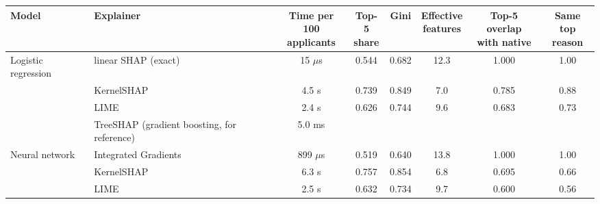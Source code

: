 \begin{tabular}{llcccccc}
\toprule
Model & Explainer & \makecell{Time per 100\\applicants} & \makecell{Top-5\\share} & Gini & \makecell{Effective\\features} & \makecell{Top-5 overlap\\with native} & \makecell{Same top\\reason} \\
\midrule
Logistic regression & linear SHAP (exact) & 15 $\mu$s & 0.544 & 0.682 & 12.3 & 1.000 & 1.00 \\
 & KernelSHAP & 4.5 s & 0.739 & 0.849 & 7.0 & 0.785 & 0.88 \\
 & LIME & 2.4 s & 0.626 & 0.744 & 9.6 & 0.683 & 0.73 \\
 & TreeSHAP (gradient boosting, for reference) & 5.0 ms & & & & & \\
\midrule
Neural network & Integrated Gradients & 899 $\mu$s & 0.519 & 0.640 & 13.8 & 1.000 & 1.00 \\
 & KernelSHAP & 6.3 s & 0.757 & 0.854 & 6.8 & 0.695 & 0.66 \\
 & LIME & 2.5 s & 0.632 & 0.734 & 9.7 & 0.600 & 0.56 \\
\bottomrule
\end{tabular}
